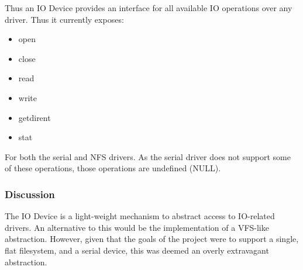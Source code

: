 \documentclass[a4paper,12pt]{article}
\begin{document}
Thus an IO Device provides an interface for all available IO operations over
any driver.  Thus it currently exposes:

\begin{itemize}
\item open
\item close
\item read
\item write
\item getdirent
\item stat
\end{itemize}

For both the serial and NFS drivers.  As the serial driver does not support
some of these operations, those operations are undefined (NULL).

\subsubsection{Discussion}
The IO Device is a light-weight mechanism to abstract access to IO-related
drivers.  An alternative to this would be the implementation of a VFS-like
abstraction.  However, given that the goals of the project were to support a
single, flat filesystem, and a serial device, this was deemed an overly
extravagant abstraction.
\end{document}
